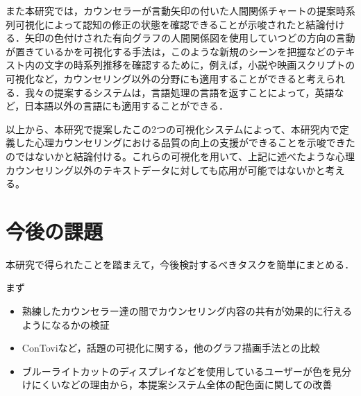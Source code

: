 \documentclass[shuuron]{kuee}
\begin{document}

また本研究では，カウンセラーが言動矢印の付いた人間関係チャートの提案時系列可視化によって認知の修正の状態を確認できることが示唆されたと結論付ける．矢印の色付けされた有向グラフの人間関係図を使用していつどの方向の言動が置きているかを可視化する手法は，このような新規のシーンを把握などのテキスト内の文字の時系列推移を確認するために，例えば，小説や映画スクリプトの可視化など，カウンセリング以外の分野にも適用することができると考えられる．我々の提案するシステムは，言語処理の言語を返すことによって，英語など，日本語以外の言語にも適用することができる．

以上から、本研究で提案したこの2つの可視化システムによって、本研究内で定義した心理カウンセリングにおける品質の向上の支援ができることを示唆できたのではないかと結論付ける。これらの可視化を用いて、上記に述べたような心理カウンセリング以外のテキストデータに対しても応用が可能ではないかと考える。


\section{今後の課題}

本研究で得られたことを踏まえて，今後検討するべきタスクを簡単にまとめる．

まず

\begin{itemize}
  \item 熟練したカウンセラー達の間でカウンセリング内容の共有が効果的に行えるようになるかの検証
  \item ConTovi\cite{el2016contovi}など，話題の可視化に関する，他のグラフ描画手法との比較
  \item ブルーライトカットのディスプレイなどを使用しているユーザーが色を見分けにくいなどの理由から，本提案システム全体の配色面に関しての改善
\end{itemize}
\end{document}
